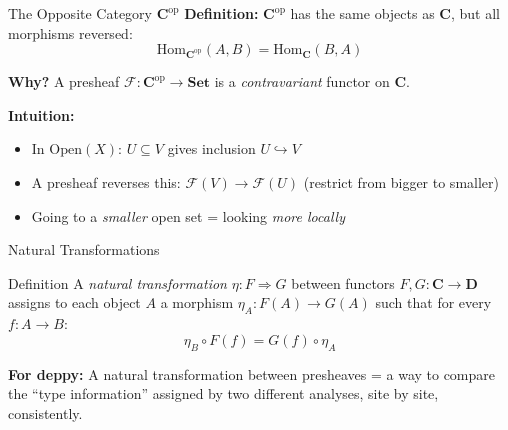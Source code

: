 \documentclass[aspectratio=169,10pt]{beamer}
\newcommand{\Fscr}{\mathcal{F}}
\newcommand{\op}{\mathrm{op}}
\newcommand{\Hom}{\mathrm{Hom}}
\newcommand{\Set}{\mathbf{Set}}
\newcommand{\Open}{\mathrm{Open}}
\begin{document}
\begin{frame}{The Opposite Category $\mathbf{C}^{\op}$}
\textbf{Definition:} $\mathbf{C}^{\op}$ has the same objects as $\mathbf{C}$, but all morphisms reversed:
\[
\Hom_{\mathbf{C}^{\op}}(A, B) = \Hom_{\mathbf{C}}(B, A)
\]

\textbf{Why?} A presheaf $\Fscr : \mathbf{C}^{\op} \to \Set$ is a \emph{contravariant} functor on $\mathbf{C}$.

\vspace{0.3em}
\textbf{Intuition:}
\begin{itemize}
  \item In $\Open(X)$: $U \subseteq V$ gives inclusion $U \hookrightarrow V$
  \item A presheaf reverses this: $\Fscr(V) \to \Fscr(U)$ (restrict from bigger to smaller)
  \item Going to a \emph{smaller} open set = looking \emph{more locally}
\end{itemize}
\end{frame}

\begin{frame}[fragile]{Natural Transformations}
\begin{block}{Definition}
A \emph{natural transformation} $\eta : F \Rightarrow G$ between functors $F, G : \mathbf{C} \to \mathbf{D}$ assigns to each object $A$ a morphism $\eta_A : F(A) \to G(A)$ such that for every $f : A \to B$:
\[
\eta_B \circ F(f) = G(f) \circ \eta_A
\]
\end{block}

\begin{center}
\end{center}

\textbf{For deppy:} A natural transformation between presheaves = a way to compare the ``type information'' assigned by two different analyses, site by site, consistently.
\end{frame}
\end{document}
